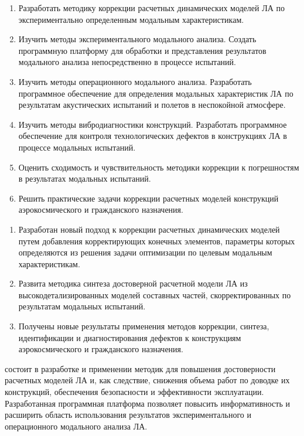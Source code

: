 {\tasks}
\begin{enumerate}[beginpenalty = 10000] 
	\item Разработать методику коррекции расчетных динамических моделей ЛА по экспериментально определенным модальным характеристикам.
	\item Изучить методы экспериментального модального анализа. Создать программную платформу для обработки и представления результатов модального анализа непосредственно в процессе испытаний. 
	\item Изучить методы операционного модального анализа. Разработать программное обеспечение для определения модальных характеристик ЛА по результатам акустических испытаний и полетов в неспокойной атмосфере.
	\item Изучить методы вибродиагностики конструкций. Разработать программное обеспечение для контроля технологических дефектов в конструкциях ЛА в процессе модальных испытаний. 
	\item Оценить сходимость и чувствительность методики коррекции к погрешностям в результатах модальных испытаний. 
	\item Решить практические задачи коррекции расчетных моделей конструкций аэрокосмического и гражданского назначения.
\end{enumerate}

{\novelty}
\begin{enumerate}[beginpenalty = 10000] 
	\item Разработан новый подход к коррекции расчетных динамических моделей путем добавления корректирующих конечных элементов, параметры которых определяются из решения задачи оптимизации по целевым модальным характеристикам.
	\item Развита методика синтеза достоверной расчетной модели ЛА из высокодетализированных моделей составных частей, скорректированных по результатам модальных испытаний.
	\item Получены новые результаты применения методов коррекции, синтеза, идентификации и диагностирования дефектов к конструкциям аэрокосмического и гражданского назначения.
\end{enumerate}

{\influence} состоит в разработке и применении методик для повышения достоверности расчетных моделей ЛА и, как следствие, снижения объема работ по доводке их конструкций, обеспечения безопасности и эффективности эксплуатации. Разработанная программная платформа позволяет повысить информативность и расширить область использования результатов экспериментального и операционного модального анализа ЛА.

